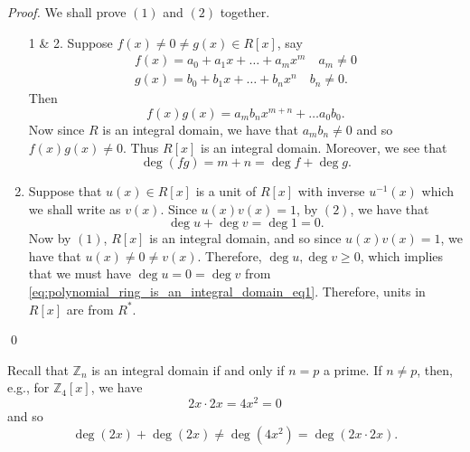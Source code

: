 \begin{proof}
  We shall prove $(1)$ and $(2)$ together.
  \begin{enumerate}
    \item[1 \& 2.] Suppose $f(x) \neq 0 \neq g(x) \in R[x]$, say
      \begin{gather*}
        f(x) = a_0 + a_1 x + \hdots + a_m x^m \quad a_m \neq 0 \\
        g(x) = b_0 + b_1 x + \hdots + b_n x^n \quad b_n \neq 0.
      \end{gather*}
      Then
      \begin{equation*}
        f(x) g(x) = a_m b_n x^{m + n} + \hdots a_0 b_0.
      \end{equation*}
      Now since $R$ is an integral domain, we have that $a_m b_n \neq 0$ and so $f(x) g(x) \neq 0$. Thus $R[x]$ is an integral domain. Moreover, we see that
      \begin{equation*}
        \deg (fg) = m + n = \deg f + \deg g.
      \end{equation*}

      \setcounter{enumi}{2}
    \item Suppose that $u(x) \in R[x]$ is a unit of $R[x]$ with inverse $u^{-1}(x)$ which we shall write as $v(x)$. Since $u(x) v(x) = 1$, by $(2)$, we have that
      \begin{equation}\label{eq:polynomial_ring_is_an_integral_domain_eq1}
        \deg u + \deg v = \deg 1 = 0.
      \end{equation}
      Now by $(1)$, $R[x]$ is an integral domain, and so since $u(x) v(x) = 1$, we have that $u(x) \neq 0 \neq v(x)$. Therefore, $\deg u, \deg v \geq 0$, which implies that we must have $\deg u = 0 = \deg v$ from \cref{eq:polynomial_ring_is_an_integral_domain_eq1}. Therefore, units in $R[x]$ are from $R^*$.
  \end{enumerate}\qed
\end{proof}

\begin{note}
  Recall that $\mathbb{Z}_n$ is an integral domain if and only if $n = p$ a prime. If $n \neq p$, then, e.g., for $\mathbb{Z}_4[x]$, we have
  \begin{equation*}
    2x\cdot 2x = 4x^2 = 0
  \end{equation*}
  and so
  \begin{equation*}
    \deg (2x) + \deg (2x) \neq \deg (4x^2) = \deg (2x \cdot 2x).
  \end{equation*}
\end{note}

